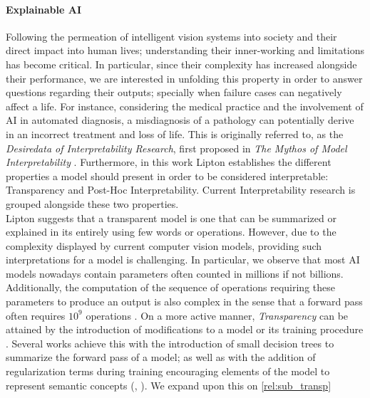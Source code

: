 \paragraph{Explainable AI} Following the permeation of intelligent vision systems into society and 
their direct impact into human lives; understanding their inner-working and limitations has become 
critical. In particular, since their complexity has increased alongside their performance, we are 
interested in unfolding this property in order to answer questions regarding their outputs; 
specially when failure cases can negatively affect a life. For instance, considering the medical 
practice and the involvement of AI in automated diagnosis, a misdiagnosis of a pathology can 
potentially derive in an incorrect treatment and loss of life. This is originally referred to, as the 
\emph{Desiredata of Interpretability Research}, first proposed in \emph{The Mythos of Model 
Interpretability} \autocite{mythos_interp}. Furthermore, in this work Lipton establishes the 
different properties a model should present in order to be considered interpretable: Transparency 
and Post-Hoc Interpretability. Current Interpretability research is grouped alongside these 
two properties.\\

\noindent Lipton suggests that a transparent model is one that can be summarized or explained 
in its entirely using few words or operations. However, due to the complexity displayed by current 
computer vision models, providing such interpretations for a model is challenging. In particular, 
we observe that most AI models nowadays contain parameters often counted in millions if not 
billions. Additionally, the computation of the sequence of operations requiring these parameters 
to produce an output is also complex in the sense that a forward pass often requires $10^9$ 
operations \autocite{openai_compute}. On a more active manner, \emph{Transparency} can be attained 
by the introduction of modifications to a model or its training procedure 
\autocite{zhang2021survey}. Several works achieve this with the introduction of small decision 
trees to summarize the forward pass of a model; as well as with the addition of regularization terms 
during training encouraging elements of the model to represent semantic concepts 
(\cite{bau2017network}, \cite{wu2018beyond}). We expand upon this on \autoref{rel:sub_transp}\\


